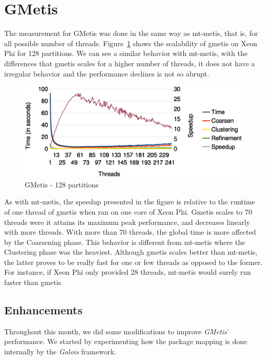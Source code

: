 \documentclass[abstract=on,9pt,twocolumn]{scrartcl}
\begin{document}
\section{GMetis} 
\label{sec:gmetis}
The measurement for GMetis was done in the same way as mt-metis, that
is, for all possible number of threads. Figure~\ref{gmetis128} shows the
scalability of gmetis on Xeon Phi for 128 partitions. We can see a
similar behavior with mt-metis, with the differences that gmetis scales
for a higher number of threads, it does not have a irregular behavior
and the performance declines is not so abrupt.

\begin{center}
\begin{figure}[htb]
    \includegraphics[width=\columnwidth]{img/gmetis128.eps}
    \caption{GMetis - 128 partitions}
    \label{gmetis128}
\end{figure}
\end{center}

As with mt-metis, the speedup presented in the figure is relative to the
runtime of one thread of gmetis when ran on one core of Xeon Phi. Gmetis
scales to 70 threads were it attains its maximum peak performance, and
decreases linearly with more threads. With more than 70 threads, the
global time is more affected by the Coarsening phase. This behavior is
different from mt-metis where the Clustering phase was the heaviest.
Although gmetis scales better than mt-metis, the latter proves to be
really fast for one or few threads as opposed to the former. For
instance, if Xeon Phi only provided 28 threads, mt-metis would
surely run faster than gmetis.

\subsection{Enhancements}
\label{sec:enhan}
Throughout this month, we did some modifications to improve
\textit{GMetis}' performance. We started by experimenting how the
package mapping is done internally by the \textit{Galois} framework.
\end{document}
